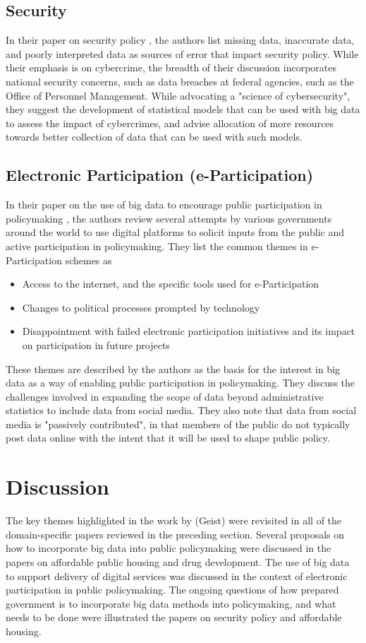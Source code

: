 \documentclass[sigconf]{acmart}
\begin{document}
\subsection{Security}
In their paper on security policy \cite{graves_2016}, the authors list missing data, inaccurate data, and poorly interpreted data as sources of error that impact security policy. While their emphasis is on cybercrime, the breadth of their discussion incorporates national security concerns, such as data breaches at federal agencies, such as the Office of Personnel Management. While advocating a "science of cybersecurity", they suggest the development of statistical models that can be used with big data to assess the impact of cybercrimes, and advise allocation of more resources towards better collection of data that can be used with such models.

\subsection{Electronic Participation (e-Participation)}
In their paper on the use of big data to encourage public participation in policymaking \cite{bright_2016}, the authors review several attempts by various governments around the world to use digital platforms to solicit inputs from the public and active participation in policymaking. They list the common themes in e-Participation schemes as
\begin{itemize} 
   \item Access to the internet, and the specific tools used for e-Participation
   \item Changes to political processes prompted by technology
   \item Disappointment with failed electronic participation initiatives and its impact on participation in future projects
\end{itemize}
These themes are described by the authors as the basis for the interest in big data as a way of enabling public participation in policymaking. They discuss the challenges involved in expanding the scope of data beyond administrative statistics to include data from social media. They also note that data from social media is "passively contributed", in that members of the public do not typically post data online with the intent that it will be used to shape public policy. 

\section{Discussion}
The key themes highlighted in the work by (Geist) were revisited in all of the domain-specific papers reviewed in the preceding section. Several proposals on how to incorporate big data into public policymaking were discussed in the papers on affordable public housing and drug development. The use of big data to support delivery of digital services was discussed in the context of electronic participation in public policymaking. The ongoing questions of how prepared government is to incorporate big data methods into policymaking, and what needs to be done were illustrated the papers on security policy and affordable housing.
 
\end{document}
